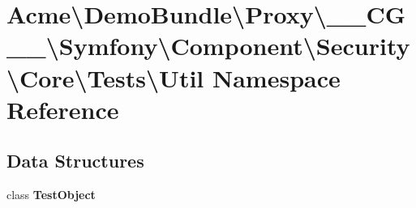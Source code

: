 \section{Acme\textbackslash{}Demo\+Bundle\textbackslash{}Proxy\textbackslash{}\+\_\+\+\_\+\+C\+G\+\_\+\+\_\+\textbackslash{}Symfony\textbackslash{}Component\textbackslash{}Security\textbackslash{}Core\textbackslash{}Tests\textbackslash{}Util Namespace Reference}
\label{namespace_acme_1_1_demo_bundle_1_1_proxy_1_1_____c_g_____1_1_symfony_1_1_component_1_1_security_1_1_core_1_1_tests_1_1_util}
\subsection*{Data Structures}
\begin{DoxyCompactItemize}
\item 
class {\bf Test\+Object}
\end{DoxyCompactItemize}
